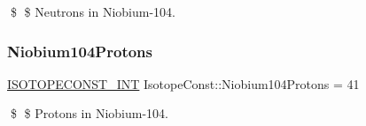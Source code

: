 \$ \$ Neutrons in Niobium-\/104. \mbox{\label{group___isotope_const-_niobium-_nb104_gaf194156b730dcd738361a25511f0a490}} 
\subsubsection{\texorpdfstring{Niobium104\+Protons}{Niobium104Protons}}
{\footnotesize\ttfamily \mbox{\hyperlink{group___isotope_const-_macros_ga5f18360b3e99483a35c32d789e62621c}{I\+S\+O\+T\+O\+P\+E\+C\+O\+N\+S\+T\+\_\+\+I\+NT}} Isotope\+Const\+::\+Niobium104\+Protons = 41}

\$ \$ Protons in Niobium-\/104. 
